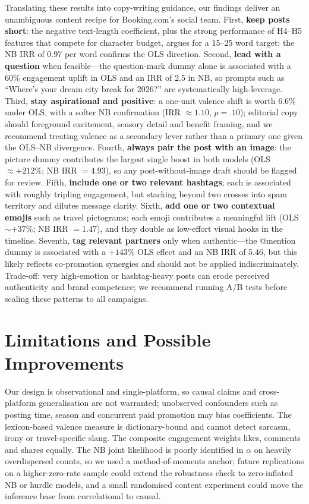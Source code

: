 \documentclass[12pt,a4paper]{article}
\begin{document}
Translating these results into copy-writing guidance, our findings deliver an unambiguous content recipe for Booking.com's social team. First, \textbf{keep posts short}: the negative text-length coefficient, plus the strong performance of H4--H5 features that compete for character budget, argues for a 15--25 word target; the NB IRR of $0.97$ per word confirms the OLS direction. Second, \textbf{lead with a question} when feasible---the question-mark dummy alone is associated with a 60\% engagement uplift in OLS and an IRR of 2.5 in NB, so prompts such as ``Where's your dream city break for 2026?'' are systematically high-leverage. Third, \textbf{stay aspirational and positive}: a one-unit valence shift is worth 6.6\% under OLS, with a softer NB confirmation (IRR $\approx 1.10$, $p=.10$); editorial copy should foreground excitement, sensory detail and benefit framing, and we recommend treating valence as a secondary lever rather than a primary one given the OLS--NB divergence. Fourth, \textbf{always pair the post with an image}: the picture dummy contributes the largest single boost in both models (OLS $\approx +212\%$; NB IRR $=4.93$), so any post-without-image draft should be flagged for review. Fifth, \textbf{include one or two relevant hashtags}; each is associated with roughly tripling engagement, but stacking beyond two crosses into spam territory and dilutes message clarity. Sixth, \textbf{add one or two contextual emojis} such as travel pictograms; each emoji contributes a meaningful lift (OLS $\sim+37\%$; NB IRR $=1.47$), and they double as low-effort visual hooks in the timeline. Seventh, \textbf{tag relevant partners} only when authentic---the @mention dummy is associated with a $+143\%$ OLS effect and an NB IRR of 5.46, but this likely reflects co-promotion synergies and should not be applied indiscriminately. Trade-off: very high-emotion or hashtag-heavy posts can erode perceived authenticity and brand competence; we recommend running A/B tests before scaling these patterns to all campaigns.

\section{Limitations and Possible Improvements}

Our design is observational and single-platform, so causal claims and cross-platform generalisation are not warranted; unobserved confounders such as posting time, season and concurrent paid promotion may bias coefficients. The lexicon-based valence measure is dictionary-bound and cannot detect sarcasm, irony or travel-specific slang. The composite engagement weights likes, comments and shares equally. The NB joint likelihood is poorly identified in $\alpha$ on heavily overdispersed counts, so we used a method-of-moments anchor; future replications on a higher-zero-rate sample could extend the robustness check to zero-inflated NB or hurdle models, and a small randomised content experiment could move the inference base from correlational to causal.
\end{document}

